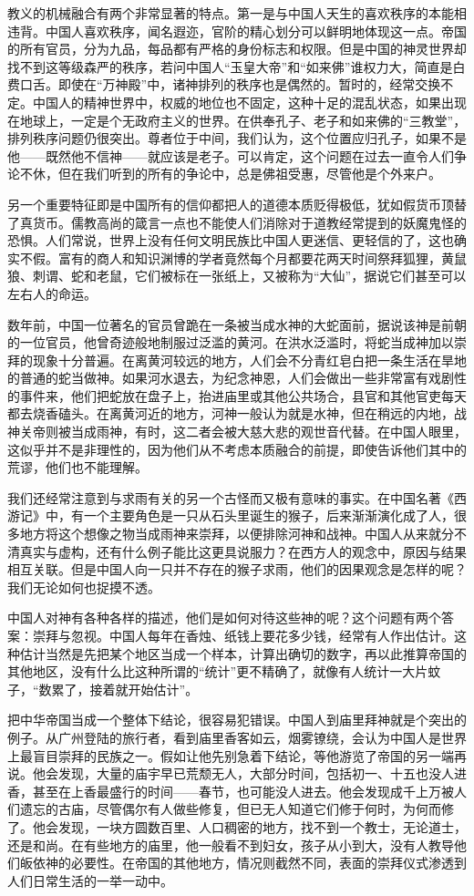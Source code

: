\documentclass[12pt,oneside]{book}
\begin{document}
\begin{common-format}
教义的机械融合有两个非常显著的特点。第一是与中国人天生的喜欢秩序的本能相违背。中国人喜欢秩序，闻名遐迩，官阶的精心划分可以鲜明地体现这一点。帝国的所有官员，分为九品，每品都有严格的身份标志和权限。但是中国的神灵世界却找不到这等级森严的秩序，若问中国人“玉皇大帝”和“如来佛”谁权力大，简直是白费口舌。即使在“万神殿”中，诸神排列的秩序也是偶然的。暂时的，经常交换不定。中国人的精神世界中，权威的地位也不固定，这种十足的混乱状态，如果出现在地球上，一定是个无政府主义的世界。在供奉孔子、老子和如来佛的“三教堂”，排列秩序问题仍很突出。尊者位于中间，我们认为，这个位置应归孔子，如果不是他——既然他不信神——就应该是老子。可以肯定，这个问题在过去一直令人们争论不休，但在我们听到的所有的争论中，总是佛祖受惠，尽管他是个外来户。 

另一个重要特征即是中国所有的信仰都把人的道德本质贬得极低，犹如假货币顶替了真货币。儒教高尚的箴言一点也不能使人们消除对于道教经常提到的妖魔鬼怪的恐惧。人们常说，世界上没有任何文明民族比中国人更迷信、更轻信的了，这也确实不假。富有的商人和知识渊博的学者竟然每个月都要花两天时间祭拜狐狸，黄鼠狼、刺谓、蛇和老鼠，它们被标在一张纸上，又被称为“大仙”，据说它们甚至可以左右人的命运。 

数年前，中国一位著名的官员曾跪在一条被当成水神的大蛇面前，据说该神是前朝的一位官员，他曾奇迹般地制服过泛滥的黄河。在洪水泛滥时，将蛇当成神加以崇拜的现象十分普遍。在离黄河较远的地方，人们会不分青红皂白把一条生活在旱地的普通的蛇当做神。如果河水退去，为纪念神恩，人们会做出一些非常富有戏剧性的事件来，他们把蛇放在盘子上，抬进庙里或其他公共场合，县官和其他官吏每天都去烧香磕头。在离黄河近的地方，河神一般认为就是水神，但在稍远的内地，战神关帝则被当成雨神，有时，这二者会被大慈大悲的观世音代替。在中国人眼里，这似乎并不是非理性的，因为他们从不考虑本质融合的前提，即使告诉他们其中的荒谬，他们也不能理解。 

我们还经常注意到与求雨有关的另一个古怪而又极有意味的事实。在中国名著《西游记》中，有一个主要角色是一只从石头里诞生的猴子，后来渐渐演化成了人，很多地方将这个想像之物当成雨神来崇拜，以便排除河神和战神。中国人从来就分不清真实与虚构，还有什么例子能比这更具说服力？在西方人的观念中，原因与结果相互关联。但是中国人向一只并不存在的猴子求雨，他们的因果观念是怎样的呢？我们无论如何也捉摸不透。 

中国人对神有各种各样的描述，他们是如何对待这些神的呢？这个问题有两个答案：崇拜与忽视。中国人每年在香烛、纸钱上要花多少钱，经常有人作出估计。这种估计当然是先把某个地区当成一个样本，计算出确切的数字，再以此推算帝国的其他地区，没有什么比这种所谓的“统计”更不精确了，就像有人统计一大片蚊子，“数累了，接着就开始估计”。 

把中华帝国当成一个整体下结论，很容易犯错误。中国人到庙里拜神就是个突出的例子。从广州登陆的旅行者，看到庙里香客如云，烟雾镣绕，会认为中国人是世界上最盲目崇拜的民族之一。假如让他先别急着下结论，等他游览了帝国的另一端再说。他会发现，大量的庙宇早已荒颓无人，大部分时间，包括初一、十五也没人进香，甚至在上香最盛行的时间——春节，也可能没人进去。他会发现成千上万被人们遗忘的古庙，尽管偶尔有人做些修复，但已无人知道它们修于何时，为何而修了。他会发现，一块方圆数百里、人口稠密的地方，找不到一个教士，无论道士，还是和尚。在有些地方的庙里，他一般看不到妇女，孩子从小到大，没有人教导他们皈依神的必要性。在帝国的其他地方，情况则截然不同，表面的崇拜仪式渗透到人们日常生活的一举一动中。 


\end{common-format}
\end{document}
